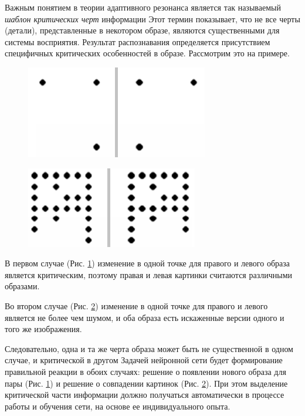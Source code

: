 \documentclass[14pt,a4paper,report]{article}
\begin{document}
Важным понятием в теории адаптивного резонанса является так называемый \textit{шаблон критических черт} информации \cite{cite-lek-narod} Этот термин показывает, что не все черты (детали), представленные в некотором образе, являются существенными для системы восприятия. Результат распознавания определяется присутствием специфичных критических особенностей в образе. Рассмотрим это на примере.

\begin{figure}[h!]
	\centering
	\includegraphics[scale = 0.80]{images/1.png}
	\caption{}
	\label{critical1}
\end{figure}

\clearpage

\begin{figure}[h!]
	\centering
	\includegraphics[scale = 0.80]{images/2.png}
	\caption{}
	\label{critical2}
\end{figure}

В первом случае (Рис. \ref{critical1}) изменение в одной точке для правого и левого образа является критическим, поэтому правая и левая картинки считаются различными образами.

Во втором случае (Рис. \ref{critical2}) изменение в одной точке для правого и левого является не более чем шумом, и оба образа есть искаженные версии одного и того же изображения.

Следовательно, одна и та же черта образа может быть не существенной в одном случае, и критической в другом \cite{cite-kgeu-adapt} Задачей нейронной сети будет формирование правильной реакции в обоих случаях:  решение о появлении нового образа для пары (Рис. \ref{critical1}) и  решение о совпадении картинок (Рис. \ref{critical2}). При этом выделение критической части информации должно получаться автоматически в процессе работы и обучения сети, на основе ее индивидуального опыта.
\end{document}
